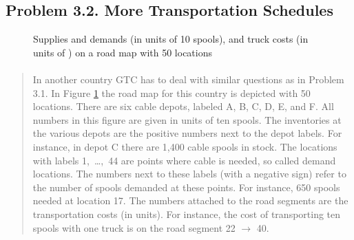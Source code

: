 \subsection{Problem 3.2. More Transportation Schedules}

\begin{figure}[H]
	\centering
	\caption{Supplies and demands (in units of 10 spools), and truck costs (in units of ) on a road map with 50 locations}
	\label{network3-2}
\end{figure}

\paragraph{}
\begin{quote}
In another country GTC has to deal with similar questions as in Problem 3.1. In Figure \ref{network3-2} the road map for this country is depicted with 50 locations. There are six cable depots, labeled A, B, C, D, E, and F. All numbers in this figure are given in units of ten spools. The inventories at the various depots are the positive numbers next to the depot labels. For instance, in depot C there are 1,400 cable spools in stock. The locations with labels 1,~\dots,~44 are points where cable is needed, so called demand locations. The numbers next to these labels (with a negative sign) refer to the number of spools demanded at these points. For instance, 650 spools needed at location 17. The numbers attached to the road segments are the transportation costs (in  units). For instance, the cost of transporting ten spools with one truck is  on the road segment 22 $\rightarrow$ 40.
\end{quote}

